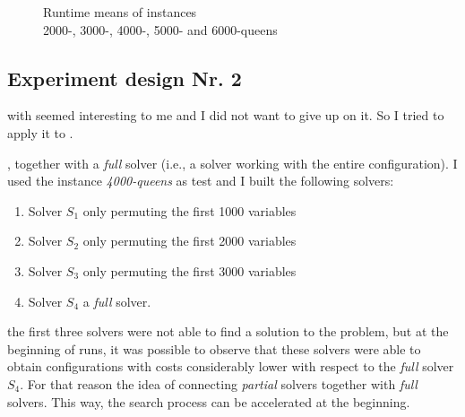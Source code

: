\begin{figure}
\caption[]{Runtime means of instances \\2000-, 3000-, 4000-, 5000- and 6000-queens}
\label{fig:results_nq}
\end{figure}

\subsection{Experiment design Nr. 2}

 with \sgp{} seemed interesting to me and I did not want to give up on it. So I tried to apply it to \nqp. 

, together with a {\it full} solver (i.e., a solver working with the entire configuration). I used the instance \textit{4000-queens} as test and I built the following solvers:
\begin{enumerate}
\item Solver $S_1$ only permuting the first 1000 variables
\item Solver $S_2$ only permuting the first 2000 variables
\item Solver $S_3$ only permuting the first 3000 variables
\item Solver $S_4$ a {\it full} solver.
\end{enumerate}

 the first three solvers were not able to find a solution to the problem, but at the beginning of runs, it was possible to observe that these solvers were able to obtain configurations with costs considerably lower with respect to the {\it full} solver $S_4$. For that reason the idea of connecting {\it partial} solvers together with {\it full} solvers. This way, the search process can be accelerated at the beginning.

